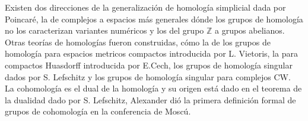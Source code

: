 \documentclass[12pt,letterpaper]{article}
\begin{document}
Existen dos direcciones de la generalización de homología simplicial dada por Poincaré, la de complejos a espacios más generales dónde los grupos de homología no los caracterizan variantes numéricos y los del grupo $\mathbb{Z}$ a grupos abelianos. Otras teorías de homologías fueron construidas, cómo la de los grupos de homología para espacios metricos compactos introducida por L. Vietoris, la para compactos Huasdorff introducida por E.Cech, los grupos de homología singular dados por S. Lefschitz y los grupos de homología singular para complejos CW. \\

La cohomología es el dual de la homología y su origen está dado en el teorema de la dualidad dado por S. Lefschitz, Alexander dió la primera definición formal de grupos de cohomología en la conferencia de Moscú.
\end{document}
